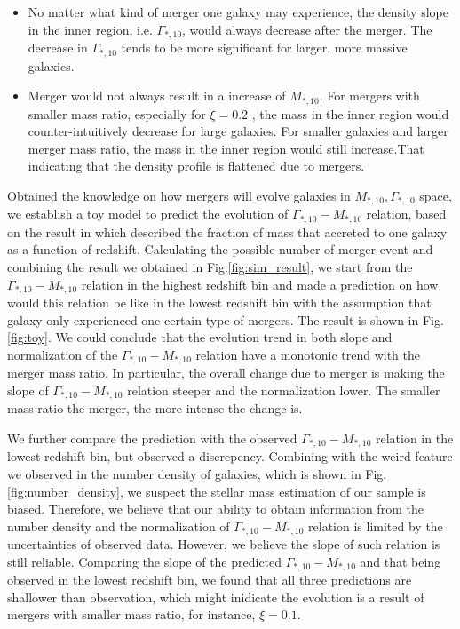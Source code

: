 \documentclass[fleqn,usenatbib]{mnras}
\begin{document}
\begin{itemize}
    \item No matter what kind of merger one galaxy may experience, the density slope in the inner region, i.e. $\Gamma_{*,10}$, would always decrease after the merger. The decrease in $\Gamma_{*,10}$ tends to be more significant for larger, more massive galaxies.
    \item Merger would not always result in a increase of $M_{*,10}$. For mergers with smaller mass ratio, especially for $\xi = 0.2$ , the mass in the inner region would counter-intuitively decrease for large galaxies. For smaller galaxies and larger merger mass ratio, the mass in the inner region would still increase.That indicating that the density profile is flattened due to mergers. 
\end{itemize}
\par Obtained the knowledge on how mergers will evolve galaxies in $M_{*,10}, \Gamma_{*,10}$ space, we establish a toy model to predict the evolution of $\Gamma_{*,10} - M_{*,10}$ relation, based on the result in \cite{2018moster} which described the fraction of mass that accreted to one galaxy as a function of redshift. Calculating the possible number of merger event and combining the result we obtained in Fig.\ref{fig:sim_result}, we start from the $\Gamma_{*,10} - M_{*,10}$ relation in the highest redshift bin and made a prediction on how would this relation be like in the lowest redshift bin with the assumption that galaxy only experienced one certain type of mergers. The result is shown in Fig.\ref{fig:toy}. We could conclude that the evolution trend in both slope and normalization of the $\Gamma_{*,10} - M_{*,10}$ relation have a monotonic trend with the merger mass ratio. In particular, the overall change due to merger is making the slope of $\Gamma_{*,10} - M_{*,10}$ relation steeper and the normalization lower. The smaller mass ratio the merger, the more intense the change is.
\par We further compare the prediction with the observed $\Gamma_{*,10} - M_{*,10}$ relation in the lowest redshift bin, but observed a discrepency. Combining with the weird feature we observed in the number density of galaxies, which is shown in Fig.\ref{fig:number_density}, we suspect the stellar mass estimation of our sample is biased. Therefore, we believe that our ability to obtain information from the number density and the normalization of $\Gamma_{*,10} - M_{*,10}$ relation is limited by the uncertainties of observed data. However, we believe the slope of such relation is still reliable. Comparing the slope of the predicted $\Gamma_{*,10} - M_{*,10}$ and that being observed in the lowest redshift bin, we found that all three predictions are shallower than observation, which might inidicate the evolution is a result of mergers with smaller mass ratio, for instance, $\xi = 0.1$. 
\end{document}
